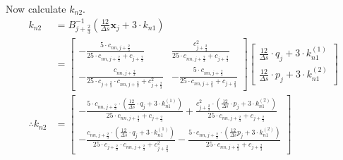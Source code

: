 \documentclass{article}
\begin{document}
Now calculate $k_{n2}$.
\begin{align*}
  k_{n2} &= B_{j+\frac{2}{3}}^{-1}\left(\frac{12}{\Delta s}\bm{x}_j + 3\cdot k_{n1} \right) \\
         &= \begin{bmatrix} -\frac{5\cdot c_{nn, j+\frac{2}{3}}}{25\cdot c_{nn, j+\frac{2}{3}} + c_{j+\frac{2}{3}}} & \frac{c^2_{j+\frac{2}{3}}}{25\cdot c_{nn, j+\frac{2}{3}} + c_{j+\frac{2}{3}}}  \\ -\frac{c_{nn, j+\frac{2}{3}}}{25\cdot c_{j+\frac{2}{3}}\cdot c_{nn, j+\frac{2}{3}} + c_{j+\frac{2}{3}}^2} & -\frac{5\cdot c_{nn, j+\frac{2}{3}}}{25\cdot c_{nn, j+\frac{2}{3}} + c_{j+\frac{2}{3}}} \end{bmatrix}\begin{bmatrix} \frac{12}{\Delta s} \cdot q_j + 3\cdot k_{n1}^{(1)} \\ \frac{12}{\Delta s} \cdot p_j + 3\cdot k_{n1}^{(2)} \end{bmatrix}\\
  \therefore k_{n2} &= \begin{bmatrix} -\frac{5\cdot c_{nn, j+\frac{2}{3}}\cdot\left(\frac{12}{\Delta s} \cdot q_j + 3\cdot k_{n1}^{(1)} \right)}{25\cdot c_{nn, j+\frac{2}{3}} + c_{j+\frac{2}{3}}} + \frac{c^2_{j+\frac{2}{3}}\cdot\left(\frac{12}{\Delta s} \cdot p_j + 3\cdot k_{n1}^{(2)}  \right)}{25\cdot c_{nn, j+\frac{2}{3}} + c_{j+\frac{2}{3}}}  \\ -\frac{c_{nn, j+\frac{2}{3}}\cdot\left(\frac{12}{\Delta s} \cdot q_j + 3\cdot k_{n1}^{(1)} \right)}{25\cdot c_{j+\frac{2}{3}}\cdot c_{nn, j+\frac{2}{3}} + c_{j+\frac{2}{3}}^2} - \frac{5\cdot c_{nn, j+\frac{2}{3}}\cdot \left(\frac{12}{\Delta s}p_j + 3\cdot k_{n1}^{(2)}  \right)}{25\cdot c_{nn, j+\frac{2}{3}} + c_{j+\frac{2}{3}}} \end{bmatrix}
\end{align*}
\end{document}
